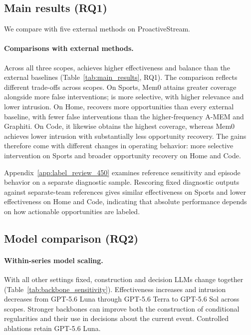 \subsection{Main results (RQ1)}
\label{sec:main_results}

We compare \system{} with five external methods on ProactiveStream.

\paragraph{Comparisons with external methods.}
Across all three scopes, \system{} achieves higher effectiveness and balance than the external baselines (Table~\ref{tab:main_results}, RQ1).
The comparison reflects different trade-offs across scopes.
On Sports, Mem0 attains greater coverage alongside more false interventions; \system{} is more selective, with higher relevance and lower intrusion.
On Home, \system{} recovers more opportunities than every external baseline, with fewer false interventions than the higher-frequency A-MEM and Graphiti.
On Code, it likewise obtains the highest coverage, whereas Mem0 achieves lower intrusion with substantially less opportunity recovery.
The gains therefore come with different changes in operating behavior: more selective intervention on Sports and broader opportunity recovery on Home and Code.

\label{sec:reviewed_diagnostics}
Appendix~\ref{app:label_review_450} examines reference sensitivity and episode behavior on a separate diagnostic sample.
Rescoring fixed diagnostic outputs against separate-team references gives similar effectiveness on Sports and lower effectiveness on Home and Code, indicating that absolute performance depends on how actionable opportunities are labeled.

\subsection{Model comparison (RQ2)}
\label{sec:model_sensitivity}

\paragraph{Within-series model scaling.}
With all other settings fixed, construction and decision LLMs change together (Table~\ref{tab:backbone_sensitivity}).
Effectiveness increases and intrusion decreases from GPT-5.6 Luna through GPT-5.6 Terra to GPT-5.6 Sol across scopes.
Stronger backbones can improve both the construction of conditional regularities and their use in decisions about the current event.
Controlled ablations retain GPT-5.6 Luna.

